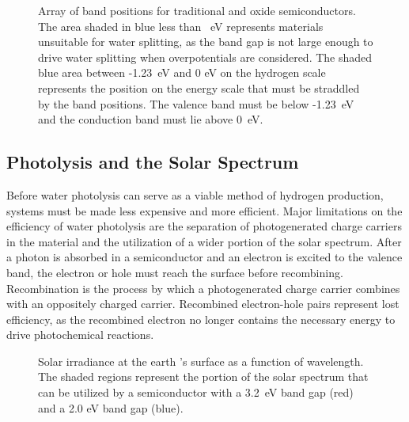 \documentclass[12pt,%
              twoside,
               letterpaper]{uiothesis}
\begin{document}
\begin{figure}
	\begin{center}
	\caption[Array of band positions for semiconductors]{%
		Array of band positions for traditional and oxide semiconductors. 
		The area shaded in blue less than ~eV represents 
		materials unsuitable for water splitting, as the band gap is not 
		large enough to drive water splitting when overpotentials are 
		considered. The shaded blue area between -1.23~eV and 0 eV on the 
		hydrogen scale represents the position on the energy scale that 
		must be straddled by the band positions. The valence band must be 
		below -1.23~eV and the conduction band must lie above 0~eV.\cite{Morrison:1980va}}
	\label{fig:morrisonarray}
	\end{center}
\end{figure}


\subsection{Photolysis and the Solar Spectrum}
\label{subsec:background.solarspectrum}


Before water photolysis can serve as a viable method of hydrogen production, systems must
be made less expensive and more efficient. Major limitations on the efficiency of water
photolysis are the separation of photogenerated charge carriers in the material and the
utilization of a wider portion of the solar spectrum. After a photon is absorbed in a
semiconductor and an electron is excited to the valence band, the electron or hole must
reach the surface before recombining. Recombination is the process by which a
photogenerated charge carrier combines with an oppositely charged carrier. Recombined
electron-hole pairs represent lost efficiency, as the recombined electron no longer
contains the necessary energy to drive photochemical reactions. 



\begin{figure}
	\caption[Solar irradiance at the earth 's surface]{%
		Solar irradiance at the earth 's surface as a function of 
		wavelength. The shaded regions represent the portion of the 
		solar spectrum that can be utilized by a semiconductor with a 
		3.2~eV band gap (red) and a 2.0 eV band gap (blue).\cite{Anonymous:jk}}
	\label{fig:solarspectrum}
\end{figure}
\end{document}
